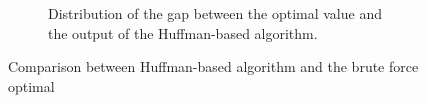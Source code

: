 \begin{figure}[H]
\begin{subfigure}{0.45\textwidth}
    \caption{Distribution of the gap between the optimal value and the output of the Huffman-based algorithm.}
    \label{fig:greedy_huffman_2}
      \end{subfigure}
    \caption{Comparison between Huffman-based algorithm and the brute force optimal}
\end{figure}